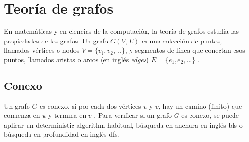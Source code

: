 
\section{Teoría de grafos}\label{graph theory}
En matemáticas y en ciencias de la computación, la teoría de grafos estudia las propiedades de los grafos. Un grafo \( G(V,E) \) es una colección de puntos, llamados vértices o nodos \( V = \{ v_1, v_2, \dots \} \), y segmentos de línea que conectan esos puntos, llamados aristas o arcos (en inglés \textit{edges}) \( E = \{ e_1, e_2, \dots \} \) \cite{even2011graph}.

\subsection{Conexo}
Un grafo \( G \) es conexo, si por cada dos vértices \( u \) y \( v \), hay un camino (finito) que comienza en \( u \) y termina en \( v \) \cite{even2011graph}. Para verificar si un grafo \( G \) es conexo, se puede aplicar un \gls{deterministic algorithm} habitual, búsqueda en anchura en inglés \acrfull{bfs} o búsqueda en profundidad en inglés \acrfull{dfs}.